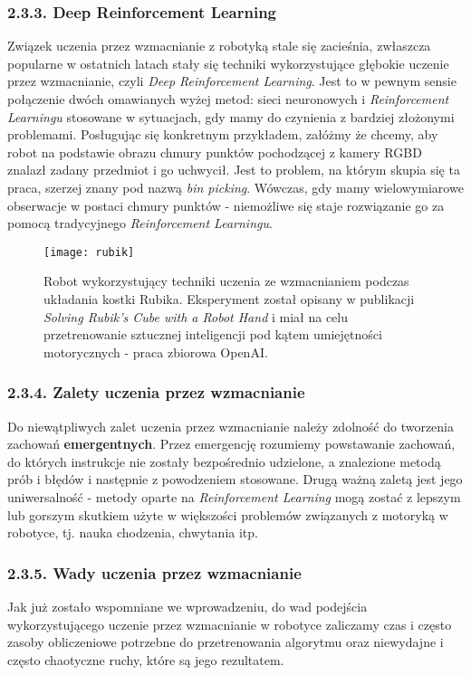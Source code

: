 \documentclass{article}
\begin{document}
\subsubsection*{\Large{2.3.3. Deep Reinforcement Learning}}
Związek uczenia przez wzmacnianie z robotyką stale się zacieśnia, zwłaszcza popularne w ostatnich latach stały się techniki wykorzystujące głębokie uczenie przez wzmacnianie, czyli \emph{Deep Reinforcement Learning}. Jest to w pewnym sensie połączenie dwóch omawianych wyżej metod: sieci neuronowych i \emph{Reinforcement Learningu} stosowane w sytuacjach, gdy mamy do czynienia z bardziej złożonymi problemami. Posługując się konkretnym przykładem, załóżmy że chcemy, aby robot na podstawie obrazu chmury punktów pochodzącej z kamery RGBD znalazł zadany przedmiot i go uchwycił. Jest to problem, na którym skupia się ta praca, szerzej znany pod nazwą \emph{bin picking}. Wówczas, gdy mamy wielowymiarowe obserwacje w postaci chmury punktów - niemożliwe się staje rozwiązanie go za pomocą tradycyjnego \emph{Reinforcement Learningu}. 

\begin{figure}[h]
\centering
\texttt{[image: rubik]}
\caption{Robot wykorzystujący techniki uczenia ze wzmacnianiem podczas układania kostki Rubika. Eksperyment został opisany w publikacji \emph{Solving Rubik's Cube with a Robot Hand} i miał na celu przetrenowanie sztucznej inteligencji pod kątem umiejętności motorycznych - praca zbiorowa OpenAI.}
\end{figure}

\subsubsection*{\Large{2.3.4. Zalety uczenia przez wzmacnianie}}
Do niewątpliwych zalet uczenia przez wzmacnianie należy zdolność do tworzenia zachowań \textbf{emergentnych}. Przez emergencję rozumiemy powstawanie zachowań, do których instrukcje nie zostały bezpośrednio udzielone, a znalezione metodą prób i błędów i następnie z powodzeniem stosowane. Drugą ważną zaletą jest jego uniwersalność - metody oparte na \emph{Reinforcement Learning} mogą zostać z lepszym lub gorszym skutkiem użyte w większości problemów związanych z motoryką w robotyce, tj. nauka chodzenia, chwytania itp.

\subsubsection*{\Large{2.3.5. Wady uczenia przez wzmacnianie}}
Jak już zostało wspomniane we wprowadzeniu, do wad podejścia wykorzystującego uczenie przez wzmacnianie w robotyce zaliczamy czas i często zasoby obliczeniowe potrzebne do przetrenowania algorytmu oraz niewydajne i często chaotyczne ruchy, które są jego rezultatem.
\end{document}
